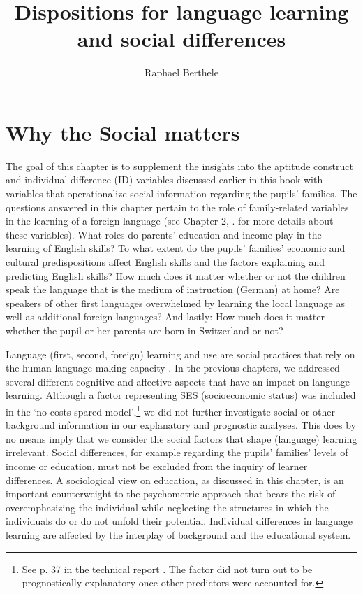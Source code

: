 \documentclass[output=paper]{langsci/langscibook}
\author{Raphael Berthele\affiliation{University of Fribourg, Institut de Plurilinguisme}\orcid{}}
\title{Dispositions for language learning and social differences}
\begin{document}
\maketitle 


\section{Why the Social matters}

The goal of this chapter is to supplement the insights into the aptitude construct and individual difference (ID) variables discussed earlier in this book with variables that operationalize social information regarding the pupils’ families. The questions answered in this chapter pertain to the role of family-related variables in the learning of a foreign language (see Chapter 2, . for more details about these variables). What roles do parents’ education and income play in the learning of English skills? To what extent do the pupils' families' economic and cultural predispositions affect English skills and the factors explaining and predicting English skills? How much does it matter whether or not the children speak the language that is the medium of instruction (German) at home? Are speakers of other first languages overwhelmed by learning the local language as well as additional foreign languages? And lastly: How much does it matter whether the pupil or her parents are born in Switzerland or not?

Language (first, second, foreign) learning and use are social practices that rely on the human language making capacity \citep{Slobin1985}. In the previous chapters, we addressed several different cognitive and affective aspects that have an impact on language learning. Although a factor representing SES (socioeconomic status) was included in the ‘no costs spared model’,\footnote{See p. 37 in the technical report \citep{Vanhove2021}. The factor did not turn out to be prognostically explanatory once other predictors were accounted for.} we did not further investigate social or other background information in our explanatory and prognostic analyses. This does by no means imply that we consider the social factors that shape (language) learning irrelevant. Social differences, for example regarding the pupils’ families’ levels of income or education, must not be excluded from the inquiry of learner differences. A sociological view on education, as discussed in this chapter, is an important counterweight to the psychometric approach that bears the risk of overemphasizing the individual while neglecting the structures in which the individuals do or do not unfold their potential. Individual differences in language learning are affected by the interplay of background and the educational system. 
\end{document}
